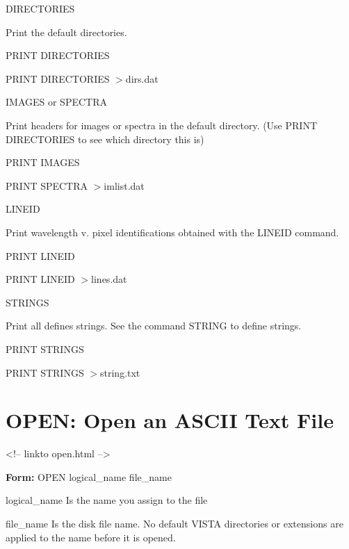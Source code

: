 \begin{example}
  \item[DIRECTORIES\hfill]{Print the default directories.
  \begin{hanging}
    \item{PRINT DIRECTORIES}
    \item{PRINT DIRECTORIES $>$dirs.dat}
  \end{hanging}
}

  \item[IMAGES or SPECTRA\hfill]{Print headers for images or spectra in the
       default directory.  (Use PRINT DIRECTORIES to see which directory
       this is)
  \begin{hanging}
    \item{PRINT IMAGES}
    \item{PRINT SPECTRA $>$imlist.dat}
  \end{hanging}
}

  \item[LINEID\hfill]{Print wavelength v. pixel identifications obtained
       with the LINEID command.
  \begin{hanging}
    \item{PRINT LINEID}
    \item{PRINT LINEID $>$lines.dat}
  \end{hanging}
}

  \item[STRINGS\hfill]{Print all defines strings.  See the command STRING
       to define strings.
  \begin{hanging}
    \item{PRINT STRINGS}
    \item{PRINT STRINGS $>$string.txt}
  \end{hanging}
}
\end{example}

\section{OPEN: Open an ASCII Text File}
\begin{rawhtml}
<!-- linkto open.html -->
\end{rawhtml}
\begin{command}
  \item[\textbf{Form: } OPEN logical\_name file\_name\hfill]{}
  \item[logical\_name]{Is the name you assign to the file}
  \item[file\_name]{Is the disk file name.  No default VISTA directories or
       extensions are applied to the name before it is opened.}
\end{command}

